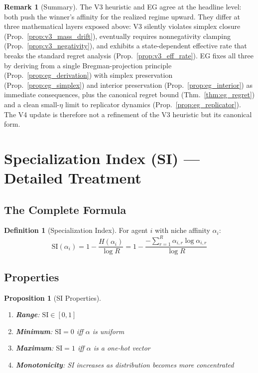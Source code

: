 \documentclass[11pt,a4paper]{article}
\theoremstyle{definition}
\newtheorem{definition}{Definition}[section]
\newtheorem{remark}{Remark}[section]
\theoremstyle{plain}
\newtheorem{proposition}{Proposition}[section]
\newcommand{\SI}{\text{SI}}
\begin{document}
\begin{remark}[Summary]
The V3 heuristic and EG agree at the headline level: both push the
winner's affinity for the realized regime upward. They differ at three
mathematical layers exposed above: V3 silently violates simplex closure
(Prop.~\ref{prop:v3_mass_drift}), eventually requires nonnegativity
clamping (Prop.~\ref{prop:v3_negativity}), and exhibits a
state-dependent effective rate that breaks the standard regret analysis
(Prop.~\ref{prop:v3_eff_rate}). EG fixes all three by deriving from a
single Bregman-projection principle (Prop.~\ref{prop:eg_derivation})
with simplex preservation (Prop.~\ref{prop:eg_simplex}) and interior
preservation (Prop.~\ref{prop:eg_interior}) as immediate consequences,
plus the canonical regret bound (Thm.~\ref{thm:eg_regret}) and a clean
small-$\eta$ limit to replicator dynamics
(Prop.~\ref{prop:eg_replicator}). The V4 update is therefore not a
refinement of the V3 heuristic but its canonical form.
\end{remark}

\section{Specialization Index (SI) --- Detailed Treatment}

\subsection{The Complete Formula}

\begin{definition}[Specialization Index]
For agent $i$ with niche affinity $\alpha_i$:
\begin{equation}
\boxed{\SI(\alpha_i) = 1 - \frac{H(\alpha_i)}{\log R} = 1 - \frac{-\sum_{r=1}^{R} \alpha_{i,r} \log \alpha_{i,r}}{\log R}}
\end{equation}
\end{definition}

\subsection{Properties}

\begin{proposition}[SI Properties]
\begin{enumerate}
    \item \textbf{Range}: $\SI \in [0, 1]$
    \item \textbf{Minimum}: $\SI = 0$ iff $\alpha$ is uniform
    \item \textbf{Maximum}: $\SI = 1$ iff $\alpha$ is a one-hot vector
    \item \textbf{Monotonicity}: SI increases as distribution becomes more concentrated
\end{enumerate}
\end{proposition}
\end{document}
